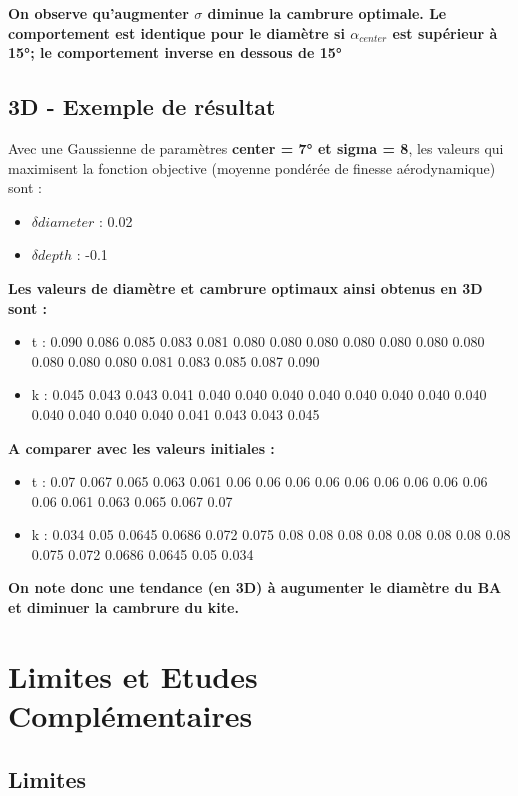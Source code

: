 \documentclass[conference]{IEEEtran}
\begin{document}
    \textbf{ On observe qu'augmenter $\sigma$ diminue la cambrure optimale. Le comportement est identique pour le diamètre si $\alpha_{center}$ est supérieur à 15°; le comportement inverse en dessous de 15°}
    

\subsection{3D - Exemple de résultat}
Avec une Gaussienne de paramètres \textbf{center = 7° et sigma = 8}, les valeurs qui maximisent la fonction objective (moyenne pondérée de finesse aérodynamique) sont :
\begin{itemize}
    \item $\delta diameter$ : 0.02
    \item $\delta depth$ : -0.1
\end{itemize}
\smallskip

\textbf{Les valeurs de diamètre et cambrure optimaux ainsi obtenus en 3D sont : 
}
\begin{itemize}
    \item t : 0.090 0.086 0.085 0.083 0.081 0.080 0.080  0.080 0.080 0.080 0.080  0.080 0.080 0.080 0.080 0.081 0.083 0.085 0.087 0.090
    \item k : 0.045 0.043 0.043 0.041 0.040 0.040 0.040  0.040 0.040 0.040 0.040 0.040 0.040 0.040  0.040 0.040 0.041 0.043 0.043 0.045
\end{itemize}
\smallskip

\textbf{A comparer avec les valeurs initiales :}
\begin{itemize}
    \item t : 0.07 0.067 0.065 0.063 0.061 0.06 0.06  0.06 0.06 0.06  0.06  0.06 0.06 0.06  0.06 0.061 0.063 0.065 0.067 0.07
    \item k : 0.034 0.05 0.0645 0.0686 0.072 0.075 0.08 0.08 0.08 0.08 0.08 0.08 0.08 0.08 0.075 0.072 0.0686 0.0645 0.05 0.034
\end{itemize}

\textbf{On note donc une tendance (en 3D) à augumenter le diamètre du BA et diminuer la cambrure du kite. }


\section{ Limites et Etudes Complémentaires}

\subsection{Limites}
\end{document}
